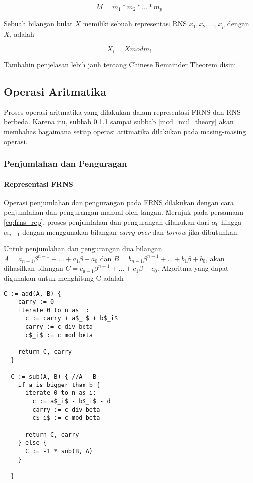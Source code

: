 \begin{equation}
  M = m_1 * m_2 * ... * m_p
\end{equation}

Sebuah bilangan bulat $X$ memiliki sebuah representasi RNS ${x_1,x_2,...,x_p}$ dengan $X_i$ adalah

\begin{equation}
  X_i = X mod m_i
\end{equation}

\colorbox{BurntOrange}{Tambahin penjelasan lebih jauh tentang Chinese Remainder Theorem disini}

\subsection{Operasi Aritmatika}
Proses operasi aritmatika yang dilakukan dalam representasi FRNS dan RNS berbeda. Karena itu, subbab \ref{add_sub_theory} sampai subbab \ref{mod_mul_theory} akan membahas bagaimana setiap operasi aritmatika dilakukan pada masing-masing operasi.

\subsubsection{Penjumlahan dan Penguragan} \label{add_sub_theory}
\paragraph{Representasi FRNS}

Operasi penjumlahan dan pengurangan pada FRNS dilakukan dengan cara penjumlahan dan pengurangan manual oleh tangan. Merujuk pada persamaan \ref{eq:frns_rep}, proses penjumlahan dan pengurangan dilakukan dari $\alpha_0$ hingga $\alpha_{n-1}$ dengan menggunakan bilangan \textit{carry over} dan \textit{borrow} jika dibutuhkan.

Untuk penjumlahan dan pengurangan dua bilangan $A = a_{n-1}\beta^{n-1}+...+a_{1}\beta+a_{0}$ dan $B = b_{n-1}\beta^{n-1}+...+b_{1}\beta+b_{0}$, akan dihasilkan bilangan $C = c_{n-1}\beta^{n-1}+...+c_{1}\beta+c_{0}$. Algoritma yang dapat digunakan untuk menghitung C adalah

\begin{lstlisting}[basicstyle=\footnotesize\rmfamily]
  C := add(A, B) {
    carry := 0
    iterate 0 to n as i:
      c := carry + a$_i$ + b$_i$
      carry := c div beta
      c$_i$ := c mod beta

    return C, carry
  }

  C := sub(A, B) { //A - B
    if a is bigger than b {
      iterate 0 to n as i:
        c := a$_i$ - b$_i$ - d
        carry := c div beta
        c$_i$ := c mod beta

      return C, carry
    } else {
      C := -1 * sub(B, A)
    }

  }
\end{lstlisting}

